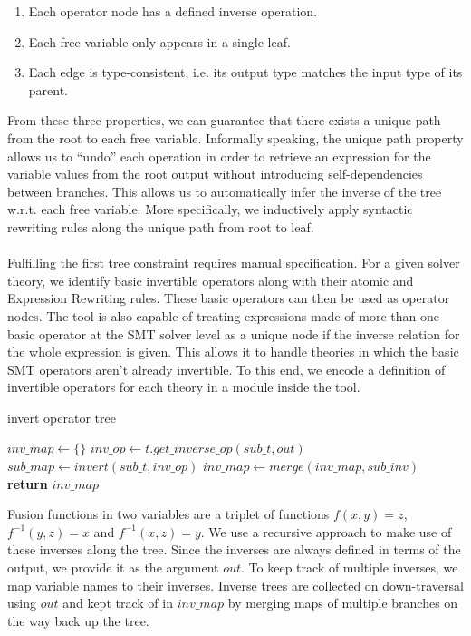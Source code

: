\documentclass[sigplan,screen]{acmart}
\begin{document}
\begin{enumerate}
    \item Each operator node has a defined inverse operation.
    \item Each free variable only appears in a single leaf.
    \item Each edge is type-consistent, i.e. its output type matches the input type of its parent.
\end{enumerate}

From these three properties, we can guarantee that there exists a unique path from the root to each free variable. Informally speaking, the unique path property allows us to ``undo'' each operation in order to retrieve an expression for the variable values from the root output without introducing self-dependencies between branches. This allows us to automatically infer the inverse of the tree w.r.t. each free variable. More specifically, we inductively apply syntactic rewriting rules along the unique path from root to leaf. 
\\ \\
Fulfilling the first tree constraint requires manual specification. For a given solver theory, we identify basic invertible operators along with their atomic and Expression Rewriting rules. These basic operators can then be used as operator nodes. The tool is also capable of treating expressions made of more than one basic operator at the SMT solver level as a unique node if the inverse relation for the whole expression is given. This allows it to handle theories in which the basic SMT operators aren't already invertible. To this end, we encode a definition of invertible operators for each theory in a module inside the tool.

\begin{algorithm}[H]
\caption{invert operator tree}
\begin{algorithmic}
        \State $inv\_map \gets \{\}$
            \State $inv\_op \gets t.get\_inverse\_op(sub\_t, out)$
            \State $sub\_map \gets invert(sub\_t, inv\_op)$
            \State $inv\_map \gets merge(inv\_map, sub\_inv)$
        \EndFor
        \State \textbf{return} $inv\_map$
    \EndProcedure
\end{algorithmic}
\end{algorithm}

Fusion functions in two variables are a triplet of functions $f(x, y) = z$, $f^{-1}(y, z) = x$ and $f^{-1}(x, z) = y$. We use a recursive approach to make use of these inverses along the tree. Since the inverses are always defined in terms of the output, we provide it as the argument $out$. To keep track of multiple inverses, we map variable names to their inverses. Inverse trees are collected on down-traversal using $out$ and kept track of in $inv\_map$ by merging maps of multiple branches on the way back up the tree.
\end{document}
